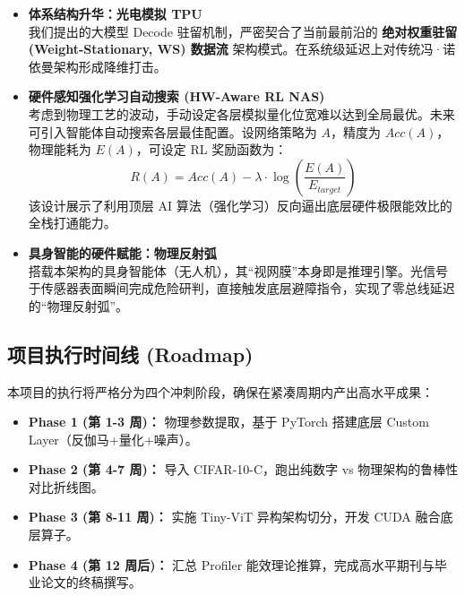 \documentclass[12pt, a4paper]{ctexart}
\begin{document}
\begin{itemize}
    \item \textbf{体系结构升华：光电模拟 TPU} \\
    我们提出的大模型 Decode 驻留机制，严密契合了当前最前沿的 \textbf{绝对权重驻留 (Weight-Stationary, WS) 数据流} 架构模式。在系统级延迟上对传统冯·诺依曼架构形成降维打击。
    
    \item \textbf{硬件感知强化学习自动搜索 (HW-Aware RL NAS)} \\
    考虑到物理工艺的波动，手动设定各层模拟量化位宽难以达到全局最优。未来可引入智能体自动搜索各层最佳配置。设网络策略为 $A$，精度为 $Acc(A)$，物理能耗为 $E(A)$，可设定 RL 奖励函数为：
    \begin{equation}
        R(A) = Acc(A) - \lambda \cdot \log \left( \frac{E(A)}{E_{target}} \right)
    \end{equation}
    该设计展示了利用顶层 AI 算法（强化学习）反向逼出底层硬件极限能效比的全栈打通能力。
    
    \item \textbf{具身智能的硬件赋能：物理反射弧} \\
    搭载本架构的具身智能体（无人机），其“视网膜”本身即是推理引擎。光信号于传感器表面瞬间完成危险研判，直接触发底层避障指令，实现了零总线延迟的“物理反射弧”。
\end{itemize}

\subsection{项目执行时间线 (Roadmap)}
本项目的执行将严格分为四个冲刺阶段，确保在紧凑周期内产出高水平成果：
\begin{itemize}
    \item \textbf{Phase 1 (第 1-3 周)：} 物理参数提取，基于 PyTorch 搭建底层 Custom Layer（反伽马+量化+噪声）。
    \item \textbf{Phase 2 (第 4-7 周)：} 导入 CIFAR-10-C，跑出纯数字 vs 物理架构的鲁棒性对比折线图。
    \item \textbf{Phase 3 (第 8-11 周)：} 实施 Tiny-ViT 异构架构切分，开发 CUDA 融合底层算子。
    \item \textbf{Phase 4 (第 12 周后)：} 汇总 Profiler 能效理论推算，完成高水平期刊与毕业论文的终稿撰写。
\end{itemize}
\end{document}
